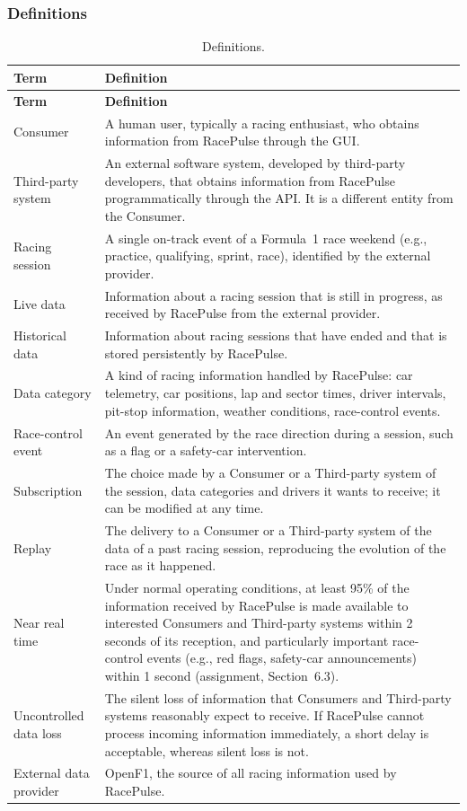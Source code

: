 \documentclass[11pt,a4paper]{article}
\newcommand{\RP}{RacePulse}
\begin{document}
\subsubsection{Definitions}
\begin{longtable}{@{}L{3.6cm} L{11.1cm}@{}}
\caption{Definitions.}\label{tab:defs}\\
\toprule \textbf{Term} & \textbf{Definition}\\ \midrule \endfirsthead
\toprule \textbf{Term} & \textbf{Definition}\\ \midrule \endhead
\bottomrule \endfoot
Consumer & A human user, typically a racing enthusiast, who obtains information from \RP{} through the GUI.\\
Third-party system & An external software system, developed by third-party developers, that obtains information from \RP{} programmatically through the API. It is a different entity from the Consumer.\\
Racing session & A single on-track event of a Formula~1 race weekend (e.g., practice, qualifying, sprint, race), identified by the external provider.\\
Live data & Information about a racing session that is still in progress, as received by \RP{} from the external provider.\\
Historical data & Information about racing sessions that have ended and that is stored persistently by \RP.\\
Data category & A kind of racing information handled by \RP: car telemetry, car positions, lap and sector times, driver intervals, pit-stop information, weather conditions, race-control events.\\
Race-control event & An event generated by the race direction during a session, such as a flag or a safety-car intervention.\\
Subscription & The choice made by a Consumer or a Third-party system of the session, data categories and drivers it wants to receive; it can be modified at any time.\\
Replay & The delivery to a Consumer or a Third-party system of the data of a past racing session, reproducing the evolution of the race as it happened.\\
Near real time & Under normal operating conditions, at least 95\% of the information received by \RP{} is made available to interested Consumers and Third-party systems within 2 seconds of its reception, and particularly important race-control events (e.g., red flags, safety-car announcements) within 1 second (assignment, Section~6.3).\\
Uncontrolled data loss & The silent loss of information that Consumers and Third-party systems reasonably expect to receive. If \RP{} cannot process incoming information immediately, a short delay is acceptable, whereas silent loss is not.\\
External data provider & OpenF1, the source of all racing information used by \RP.\\
\end{longtable}
 
\end{document}
